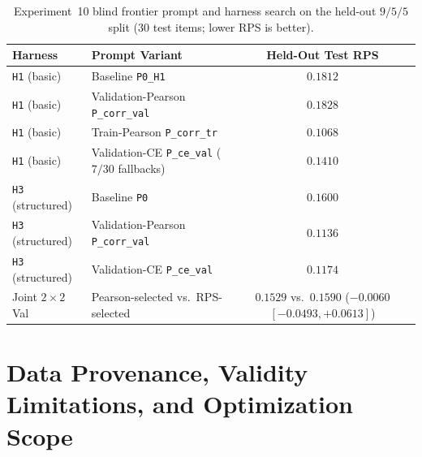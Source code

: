\begin{table}[t]
\centering
\caption{Experiment~10 blind frontier prompt and harness search on the held-out $9/5/5$ split (30 test items; lower RPS is better).}
\label{tab:supp-frontier-live}
\small
\begin{tabular}{@{}llc@{}}
\hline
Harness & Prompt Variant & Held-Out Test RPS \\
\hline
\texttt{H1} (basic) & Baseline \texttt{P0\_H1} & $0.1812$ \\
\texttt{H1} (basic) & Validation-Pearson \texttt{P\_corr\_val} & $0.1828$ \\
\texttt{H1} (basic) & Train-Pearson \texttt{P\_corr\_tr} & $0.1068$ \\
\texttt{H1} (basic) & Validation-CE \texttt{P\_ce\_val} ($7/30$ fallbacks) & $0.1410$ \\
\hline
\texttt{H3} (structured) & Baseline \texttt{P0} & $0.1600$ \\
\texttt{H3} (structured) & Validation-Pearson \texttt{P\_corr\_val} & $0.1136$ \\
\texttt{H3} (structured) & Validation-CE \texttt{P\_ce\_val} & $0.1174$ \\
\hline
Joint $2\times 2$ Val & Pearson-selected vs.\ RPS-selected & $0.1529$ vs.\ $0.1590$ ($-0.0060$ $[-0.0493,+0.0613]$) \\
\hline
\end{tabular}
\end{table}

\section{Data Provenance, Validity Limitations, and Optimization Scope}
\label{sec:supp-validity}

